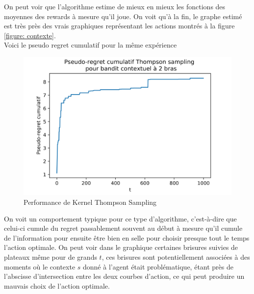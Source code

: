 \documentclass[letterpaper,11pt]{article}
\begin{document}
On peut voir que l'algorithme estime de mieux en mieux les fonctions des moyennes des rewards à mesure qu'il joue. On voit qu'à la fin, le graphe estimé est très près des vrais graphiques représentant les actions montrés à la figure \ref{figure: contexte}.\\

Voici le pseudo regret cumulatif pour la même expérience

\begin{figure}[H]
\label{figure: pseudo KTS}
\caption{Performance de Kernel Thompson Sampling}
\begin{center}
\includegraphics[scale=0.2]{pseudo-KTS.png}
\end{center}
\end{figure}

On voit un comportement typique pour ce type d'algorithme, c'est-à-dire que celui-ci cumule du regret passablement souvent au début à mesure qu'il cumule de l'information pour ensuite être bien en selle pour choisir presque tout le temps l'action optimale. On peut voir dans le graphique certaines brisures suivies de plateaux même pour de grands $t$, ces brisures sont potentiellement associées à des moments où le contexte $s$ donné à l'agent était problématique, étant près de l'abscisse d'intersection entre les deux courbes d'action, ce qui peut produire un mauvais choix de l'action optimale.
\end{document}
